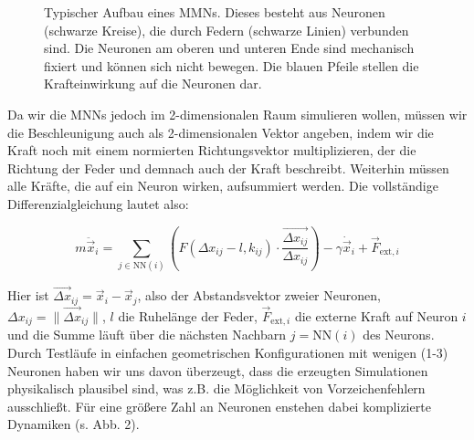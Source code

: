 \documentclass[10pt]{scrartcl}
\begin{document}
\begin{figure}[htb!]
    \centering
    {}
    \caption{Typischer Aufbau eines MMNs. Dieses besteht aus Neuronen (schwarze Kreise), die durch Federn (schwarze Linien) verbunden sind. Die Neuronen am oberen und unteren Ende sind mechanisch fixiert und können sich nicht bewegen.
    Die blauen Pfeile stellen die Krafteinwirkung auf die Neuronen dar.
    }
    \label{fig:positive_springs}
\end{figure}

Da wir die MNNs jedoch im 2-dimensionalen Raum simulieren wollen, müssen wir die Beschleunigung auch als 2-dimensionalen Vektor angeben, indem wir die Kraft noch mit einem normierten Richtungsvektor multiplizieren, der die Richtung der Feder und demnach auch der Kraft beschreibt. 
Weiterhin müssen alle Kräfte, die auf ein Neuron wirken, aufsummiert werden.
Die vollständige Differenzialgleichung lautet also:

{\[
    m \ddot{\vec{x}}_{i} = \sum_{j \in \textrm{NN}(i)} \left( F\left(\Delta x_{ij} - l, k_{ij}\right)
     \cdot \frac{\vec{\Delta x_{ij}}}{ \Delta x_{ij}} \right)
     - \gamma \dot{\vec{x}}_i + \vec{F}_{\textrm{ext}, i}
\]}

Hier ist $ \vec{\Delta x}_{ij} = \vec{x}_i - \vec{x}_j$, also der Abstandsvektor zweier Neuronen,
$\Delta x_{ij}= \| \vec{\Delta x}_{ij} \|$, $l$ die Ruhelänge der Feder, 
$\vec{F}_{\textrm{ext}, i}$ die externe Kraft auf Neuron $i$ und die Summe läuft über die nächsten Nachbarn $j = \textrm{NN}(i)$ des Neurons. 
Durch Testläufe in einfachen geometrischen Konfigurationen mit wenigen (1-3) Neuronen haben wir uns davon überzeugt, dass die erzeugten Simulationen physikalisch plausibel sind, was z.B. die Möglichkeit von Vorzeichenfehlern ausschließt. Für eine größere Zahl an Neuronen enstehen dabei komplizierte Dynamiken (s. Abb. 2).
\end{document}
